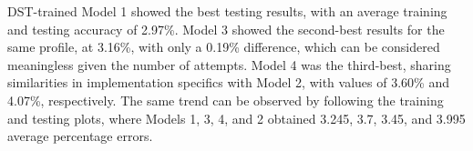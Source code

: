 DST-trained Model 1 showed the best testing results, with an average training and testing accuracy of 2.97\%.
Model 3 showed the second-best results for the same profile, at 3.16\%, with only a 0.19\% difference, which can be considered meaningless given the number of attempts.
Model 4 was the third-best, sharing similarities in implementation specifics with Model 2, with values of 3.60\% and 4.07\%, respectively.
The same trend can be observed by following the training and testing plots, where Models 1, 3, 4, and 2 obtained 3.245, 3.7, 3.45, and 3.995 average percentage errors.

%
%

%
%
